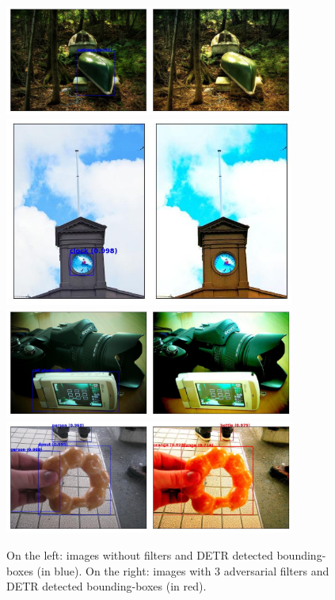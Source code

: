 \begin{figure}[h]%
    \centering
    \includegraphics[width=0.85\textwidth]{Experiments/imgs/imgdetr1.png}
    \includegraphics[width=0.85\textwidth]{Experiments/imgs/imgdetr2.png}
    \includegraphics[width=0.85\textwidth]{Experiments/imgs/imgdetr4.png}
    \includegraphics[width=0.85\textwidth]{Experiments/imgs/imgdetr5.png}
    \caption{On the left: images without filters and DETR detected bounding-boxes (in blue). On the right: images with 3 adversarial filters and DETR detected bounding-boxes (in red).}
    \label{fig:objdet_samples_detr}
\end{figure}

